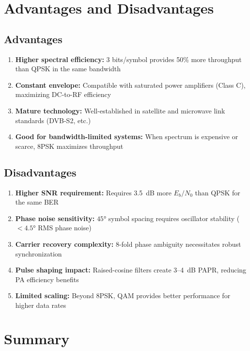 \section{Advantages and Disadvantages}

\subsection*{Advantages}

\begin{enumerate}
\item \textbf{Higher spectral efficiency:} 3 bits/symbol provides 50\% more throughput than QPSK in the same bandwidth
\item \textbf{Constant envelope:} Compatible with saturated power amplifiers (Class C), maximizing DC-to-RF efficiency
\item \textbf{Mature technology:} Well-established in satellite and microwave link standards (DVB-S2, etc.)
\item \textbf{Good for bandwidth-limited systems:} When spectrum is expensive or scarce, 8PSK maximizes throughput
\end{enumerate}

\subsection*{Disadvantages}

\begin{enumerate}
\item \textbf{Higher SNR requirement:} Requires 3.5~dB more $E_b/N_0$ than QPSK for the same BER
\item \textbf{Phase noise sensitivity:} $45°$ symbol spacing requires oscillator stability ($< 4.5°$ RMS phase noise)
\item \textbf{Carrier recovery complexity:} 8-fold phase ambiguity necessitates robust synchronization
\item \textbf{Pulse shaping impact:} Raised-cosine filters create 3--4~dB PAPR, reducing PA efficiency benefits
\item \textbf{Limited scaling:} Beyond 8PSK, QAM provides better performance for higher data rates
\end{enumerate}

\section{Summary}

